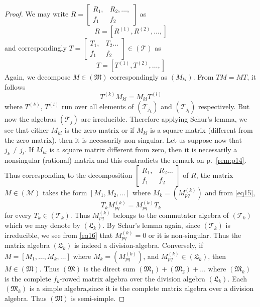\begin{proof}
We may write $R = \left[\begin{smallmatrix} R_1, & R_2,\ldots,\\
 f_1 & f_2 \end{smallmatrix}\right]$ as 
$$
R=\left[R^{(1)},  R^{(2)},\ldots,\right]
$$
 and correspondingly $T = \left[\begin{smallmatrix} T_1, & T_2
     \ldots\\ f_1 & f_2 \end{smallmatrix}\right]\in
 (\mathscr{T})$ as  
$$
 T = [T^{(1)}, T^{(2)},\ldots ,]
$$
Again, we decompose $M\in (\mathfrak{M})$ correspondingly as
$(M_{kl})$. From $T M = M T$, \pageoriginale it follows 
\begin{equation*}
 T^{(k)} M_{kl} = M_{kl} T^{(l)} \tag{15}\label{eq15}
\end{equation*}
where $T^{(k)}$, $T^{(l)}$ run over all elements of
$(\mathscr{T}_{j_k})$ and $(\mathscr{T}_{j_l})$ respectively. But now
the algebras $(\mathscr{T}_j)$ are irreducible. Therefore applying
Schur's lemma, we see that either $M_{kl}$ is the zero matrix or if
$M_{kl}$ is a square matrix (different from the zero matrix), then it
is necessarily non-singular. Let us suppose now that $j_k \neq
j_l$. If $M_{kl}$ is a square matrix different from zero, then it is
necessarily a nonsingular (rational) matrix and this contradicts the
remark on p.~\ref{rem:p14}. Thus corresponding to the decomposition
$\left[\begin{smallmatrix} R_1, & R_2 \ldots \\ f_1 &
    f_2 \end{smallmatrix}\right] $ of $R$, the matrix $M \in
(\mathscr{M})$ takes the form $[M_1, M_2, \ldots]$ where $M_k =
(M^{(k)}_{pq})$ and from \eqref{eq15},
\begin{equation*}
T_k M^{(k)}_{pq} = M^{(k)}_{pq} T_k \tag{16}\label{eq16}
\end{equation*}
for every $T_k \in (\mathscr{T}_k)$. Thus $M^{(k)}_{pq}$ belongs to
the commutator algebra of $(\mathscr{T}_k)$ which we may denote by
$(\mathfrak{L}_k)$. By Schur's lemma again, since $(\mathscr{T}_k)$ is
irreducible, we see from \eqref{eq16} that $M^{(k)}_{pq}=0$ or it is
non-singular. Thus the matrix algebra $(\mathfrak{L}_k)$ is indeed a
division-algebra. Conversely, if $M = [M_1,\ldots, M_k, \ldots]$
where $M_k = (M^{(k)}_{pq})$, and $M^{(k)}_{pq} \in (\mathfrak{L}_k)$,
then $M\in (\mathfrak{M})$. Thus $(\mathfrak{M})$ is the direct sum
$(\mathfrak{M}_1) + (\mathfrak{M}_2) + \ldots $ where
$(\mathfrak{M}_k)$ is the complete $f_k$-rowed matrix algebra over the
division algebra $(\mathfrak{L}_k)$. Each $(\mathfrak{M}_k)$ is a
simple algebra,\pageoriginale since it is the complete matrix algebra
over a division algebra. Thus $(\mathfrak{M})$ is semi-simple.


\end{proof}
